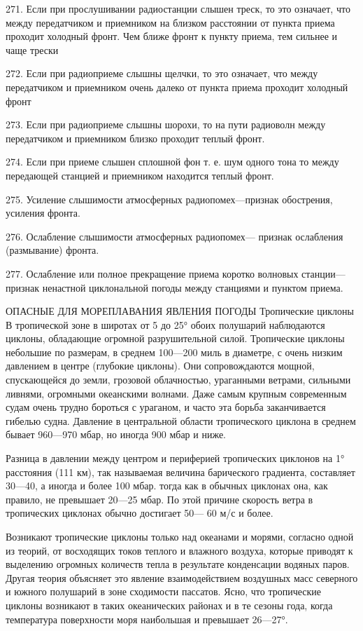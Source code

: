 271. Если при прослушивании радиостанции слышен треск, то это означает, что между передатчиком и приемником на близком расстоянии от пункта приема проходит холодный фронт. Чем ближе фронт к пункту приема, тем сильнее и чаще трески

272. Если при радиоприеме слышны щелчки, то это означает, что между передатчиком и приемником очень далеко от пункта приема проходит холодный фронт

273. Если при радиоприеме слышны шорохи, то на пути радиоволн между передатчиком и приемником близко проходит теплый фронт.

274. Если при приеме слышен сплошной фон т. е. шум одного тона то между передающей станцией и приемником находится теплый фронт.

275. Усиление слышимости атмосферных радиопомех—признак обострения, усиления фронта.

276. Ослабление слышимости атмосферных радиопомех— признак ослабления (размывание) фронта.

277. Ослабление или полное прекращение приема коротко волновых станции—признак ненастной циклональной погоды между станциями и пунктом приема.

ОПАСНЫЕ ДЛЯ МОРЕПЛАВАНИЯ ЯВЛЕНИЯ ПОГОДЫ
Тропические циклоны
В тропической зоне в широтах от 5 до 25° обоих полушарий наблюдаются циклоны, обладающие огромной разрушительной силой. Тропические циклоны небольшие по размерам, в среднем 100—200 миль в диаметре, с очень низким давлением в центре (глубокие циклоны). Они сопровождаются мощной, спускающейся до земли, грозовой облачностью, ураганными ветрами, сильными ливнями, огромными океанскими волнами. Даже самым крупным современным судам очень трудно бороться с ураганом, и часто эта борьба заканчивается гибелью судна. Давление в центральной области тропического циклона в среднем бывает 960—970 мбар, но иногда 900 мбар и ниже.

Разница в давлении между центром и периферией тропических циклонов на 1° расстояния (111 км), так называемая величина барического градиента, составляет 30—40, а иногда и более 100 мбар. тогда как в обычных циклонах она, как правило, не превышает 20—25 мбар. По этой причине скорость ветра в тропических циклонах обычно достигает 50— 60 м/с и более.

Возникают тропические циклоны только над океанами и морями, согласно одной из теорий, от восходящих токов теплого и влажного воздуха, которые приводят к выделению огромных количеств тепла в результате конденсации водяных паров. Другая теория объясняет это явление взаимодействием воздушных масс северного и южного полушарий в зоне сходимости пассатов. Ясно, что тропические циклоны возникают в таких океанических районах и в те сезоны года, когда температура поверхности моря наибольшая и превышает 26—27°.

